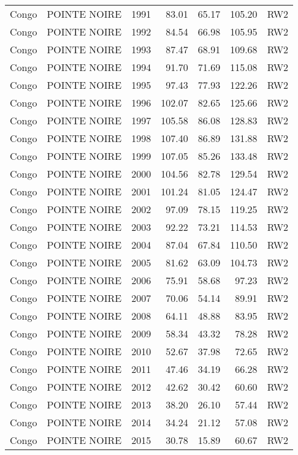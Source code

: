 \begin{longtable}{lllrrrl}
  Congo & POINTE NOIRE & 1991 & 83.01 & 65.17 & 105.20 & RW2 \\ 
  Congo & POINTE NOIRE & 1992 & 84.54 & 66.98 & 105.95 & RW2 \\ 
  Congo & POINTE NOIRE & 1993 & 87.47 & 68.91 & 109.68 & RW2 \\ 
  Congo & POINTE NOIRE & 1994 & 91.70 & 71.69 & 115.08 & RW2 \\ 
  Congo & POINTE NOIRE & 1995 & 97.43 & 77.93 & 122.26 & RW2 \\ 
  Congo & POINTE NOIRE & 1996 & 102.07 & 82.65 & 125.66 & RW2 \\ 
  Congo & POINTE NOIRE & 1997 & 105.58 & 86.08 & 128.83 & RW2 \\ 
  Congo & POINTE NOIRE & 1998 & 107.40 & 86.89 & 131.88 & RW2 \\ 
  Congo & POINTE NOIRE & 1999 & 107.05 & 85.26 & 133.48 & RW2 \\ 
  Congo & POINTE NOIRE & 2000 & 104.56 & 82.78 & 129.54 & RW2 \\ 
  Congo & POINTE NOIRE & 2001 & 101.24 & 81.05 & 124.47 & RW2 \\ 
  Congo & POINTE NOIRE & 2002 & 97.09 & 78.15 & 119.25 & RW2 \\ 
  Congo & POINTE NOIRE & 2003 & 92.22 & 73.21 & 114.53 & RW2 \\ 
  Congo & POINTE NOIRE & 2004 & 87.04 & 67.84 & 110.50 & RW2 \\ 
  Congo & POINTE NOIRE & 2005 & 81.62 & 63.09 & 104.73 & RW2 \\ 
  Congo & POINTE NOIRE & 2006 & 75.91 & 58.68 & 97.23 & RW2 \\ 
  Congo & POINTE NOIRE & 2007 & 70.06 & 54.14 & 89.91 & RW2 \\ 
  Congo & POINTE NOIRE & 2008 & 64.11 & 48.88 & 83.95 & RW2 \\ 
  Congo & POINTE NOIRE & 2009 & 58.34 & 43.32 & 78.28 & RW2 \\ 
  Congo & POINTE NOIRE & 2010 & 52.67 & 37.98 & 72.65 & RW2 \\ 
  Congo & POINTE NOIRE & 2011 & 47.46 & 34.19 & 66.28 & RW2 \\ 
  Congo & POINTE NOIRE & 2012 & 42.62 & 30.42 & 60.60 & RW2 \\ 
  Congo & POINTE NOIRE & 2013 & 38.20 & 26.10 & 57.44 & RW2 \\ 
  Congo & POINTE NOIRE & 2014 & 34.24 & 21.12 & 57.08 & RW2 \\ 
  Congo & POINTE NOIRE & 2015 & 30.78 & 15.89 & 60.67 & RW2 \\ 

\end{longtable}
